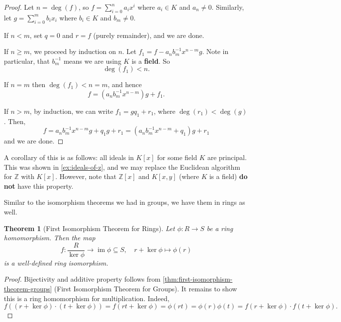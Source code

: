 \documentclass{article}
\newtheorem{theorem}{Theorem}[section]
\theoremstyle{definition}
\theoremstyle{remark}
\newcommand{\pqty}[1]{\left(#1\right)}
\newcommand{\bqty}[1]{\left[#1\right]}
\newcommand{\flatfrac}[2]{\frac{#1}{#2}}
\newcommand{\functiondomain}[3]{#1:#2\to #3}
\newcommand{\function}[5]{#1:#2\to #3,\quad #4\mapsto #5}
\newcommand{\inverse}{^{-1}}
\newcommand{\subring}{\subseteq}
\newcommand{\ZZ}{\mathbb{Z}}
\newcommand{\img}{\operatorname{im}}
\begin{document}
\begin{proof}
    Let \(n = \deg \pqty{f}\), so \(f = \sum_{i = 0}^{n} a_i x^i\) where \(a_i \in K\) and \(a_n \neq 0\). Similarly, let \(g = \sum_{i = 0}^{m} b_i x_i\) where \(b_i \in K\) and \(b_m \neq 0\).

    If \(n < m\), set \(q = 0\) and \(r = f\) (purely remainder), and we are done.

    If \(n \geq m\), we proceed by induction on \(n\). Let \(f_1 = f - a_n b_m \inverse x^{n - m} g\). Note in particular, that \(b_m \inverse\) means we are using \(K\) is a \textbf{field}. So
    \[
        \deg \pqty{f_1} < n.
    \]

    If \(n = m\) then \(\deg \pqty{f_1} < n = m\), and hence
    \[
        f = \pqty{a_n b_m \inverse x^{n - m}} g + f_1.
    \]

    If \(n > m\), by induction, we can write \(f_1 = g q_1 + r_1\), where \(\deg \pqty{r_1} < \deg \pqty{g}\). Then,
    \[
        f = a_n b_m \inverse x^{n - m} g + q_1 g + r_1 = \pqty{a_n b_m \inverse x^{n - m} + q_1} g + r_1
    \]
    and we are done.
\end{proof}

A corollary of this is as follows: all ideals in \(K\bqty{x}\) for some field \(K\) are principal. This was shown in \autoref{ex:ideals-of-z}, and we may replace the Euclidean algorithm for \(\ZZ\) with \(K \bqty{x}\). However, note that \(\ZZ \bqty{x}\) and \(K \bqty{x, y}\) (where \(K\) is a field) \textbf{do not} have this property.

Similar to the isomorphism theorems we had in groups, we have them in rings as well.

\begin{theorem}[First Isomorphism Theorem for Rings]
    \label{thm:first-isomorphism-theorem-ring}%
    Let \(\functiondomain{\phi}{R}{S}\) be a ring homomorphism. Then the map
    \[
        \function{f}{\flatfrac{R}{\ker \phi}}{\img \phi \subring S}{r + \ker \phi}{\phi\pqty{r}}
    \]
    is a well-defined ring isomorphism.
\end{theorem}

\begin{proof}
    Bijectivity and additive property follows from \autoref{thm:first-isomorphism-theorem-groups} (First Isomorphism Theorem for Groups). It remains to show this is a ring homomorphism for multiplication. Indeed,
    \[
        f\pqty{\pqty{r + \ker \phi} \cdot \pqty{t + \ker \phi}} = f \pqty{rt + \ker \phi} = \phi \pqty{rt} = \phi\pqty{r} \phi\pqty{t} = f\pqty{r + \ker \phi} \cdot f\pqty{t + \ker \phi}.
    \]
\end{proof}
\end{document}
